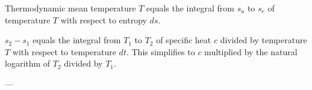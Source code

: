 Thermodynamic mean temperature \( T \) equals the integral from \( s_a \) to \( s_e \) of temperature \( T \) with respect to entropy \( ds \).  

\( s_2 - s_1 \) equals the integral from \( T_1 \) to \( T_2 \) of specific heat \( c \) divided by temperature \( T \) with respect to temperature \( dt \).  
This simplifies to \( c \) multiplied by the natural logarithm of \( T_2 \) divided by \( T_1 \).  

---
